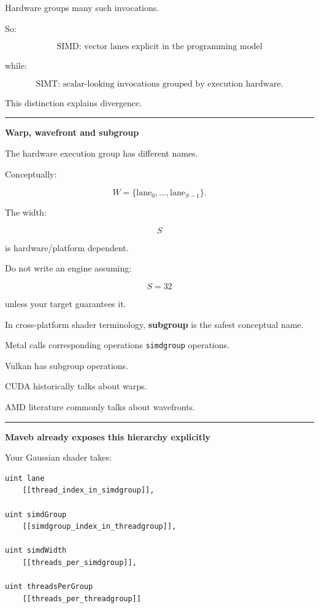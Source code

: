 Hardware groups many such invocations.

So:

\[
\boxed{
\text{SIMD: vector lanes explicit in the programming model}
}
\]

while:

\[
\boxed{
\text{SIMT: scalar-looking invocations grouped by execution hardware}.
}
\]

This distinction explains divergence.

\begin{center}\rule{0.5\linewidth}{0.5pt}\end{center}

\textbf{Warp, wavefront and subgroup}

The hardware execution group has different names.

Conceptually:

\[
\boxed{
W=\{\text{lane}_0,\dots,\text{lane}_{S-1}\}.
}
\]

The width:

\[
S
\]

is hardware/platform dependent.

Do not write an engine assuming:

\[
S=32
\]

unless your target guarantees it.

In cross-platform shader terminology, \textbf{subgroup} is the safest conceptual name.

Metal calls corresponding operations \texttt{simdgroup} operations.

Vulkan has subgroup operations.

CUDA historically talks about warps.

AMD literature commonly talks about wavefronts.

\begin{center}\rule{0.5\linewidth}{0.5pt}\end{center}

\textbf{Maveb already exposes this hierarchy explicitly}

Your Gaussian shader takes:

\protect{}\label{z8wxwy}%
\begin{verbatim}
uint lane
    [[thread_index_in_simdgroup]],

uint simdGroup
    [[simdgroup_index_in_threadgroup]],

uint simdWidth
    [[threads_per_simdgroup]],

uint threadsPerGroup
    [[threads_per_threadgroup]]
\end{verbatim}

